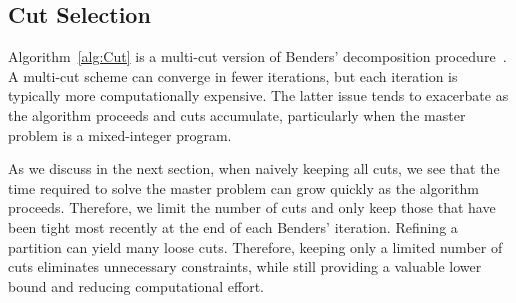 \documentclass[11pt]{article}
\newcommand{\tcr}{\textcolor{red}}
\begin{document}
	\subsection{Cut Selection}\label{subsec:cut_selection}
	Algorithm~\ref{alg:Cut} is a multi-cut version of Benders' decomposition procedure~\citep{birge1988multicut}.
	A multi-cut scheme can converge in fewer iterations, but each iteration is typically more computationally expensive. The latter issue tends to exacerbate as the algorithm proceeds and cuts accumulate, particularly when the master problem is a mixed-integer program.
	
	As we discuss in the next section, when naively keeping all cuts, we see that the time required to solve the master problem can grow quickly as the algorithm proceeds. Therefore, we limit the number of cuts and only keep those that have been tight most recently at the end of each Benders' iteration. Refining a partition can yield many loose cuts. Therefore, keeping only a limited number of cuts eliminates unnecessary constraints, while still providing a valuable lower bound and reducing computational effort. %
	
\end{document}
